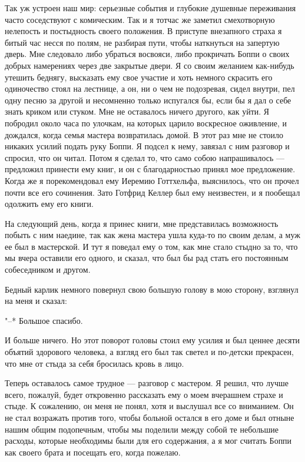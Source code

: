 Так  уж  устроен  наш  мир:  серьезные  события  и  глубокие  душевные
переживания часто соседствуют с комическим.  Так и я тотчас же заметил
смехотворную  нелепость и  постыдность  своего  положения. В  приступе
внезапного страха я битый час несся  по полям, не разбирая пути, чтобы
наткнуться на  запертую дверь.  Мне следовало либо  убраться восвояси,
либо прокричать  Боппи о  своих добрых  намерениях через  две закрытые
двери. Я со  своим желанием как-нибудь утешить  беднягу, высказать ему
свое  участие  и  хоть  немного  скрасить  его  одиночество  стоял  на
лестнице, а он,  ни о чем не подозревая, сидел  внутри, пел одну песню
за другой и несомненно только испугался бы, если бы я дал о себе знать
криком  или  стуком.  Мне  не оставалось  ничего  другого,  как  уйти.
Я  побродил  около  часа  по улочкам,  на  которых  царило  воскресное
оживление, и дождался, когда семья  мастера возвратилась домой. В этот
раз мне не  стоило никаких усилий подать руку Боппи.  Я подсел к нему,
завязал с ним разговор и спросил, что он читал. Потом я сделал то, что
само  собою напрашивалось  --- предложил  принести  ему книг,  и он  с
благодарностью принял  мое предложение. Когда же  я порекомендовал ему
Иеремию Готтхельфа, выяснилось, что он прочел почти все его сочинения.
Зато Готфрид Келлер был ему неизвестен,  и я пообещал одолжить ему его
книги.

На следующий день, когда я принес книги, мне представилась возможность
побыть  с ним  наедине, так  как жена  мастера ушла  куда-то по  своим
делам, а муж ее  был в мастерской. И тут я поведал ему  о том, как мне
стало стыдно  за то, что мы  вчера оставили его одного,  и сказал, что
был бы рад стать его постоянным собеседником и другом.

Бедный  карлик немного  повернул свою  большую голову  в мою  сторону,
взглянул на меня и сказал:

"--* Большое спасибо.

И больше ничего. Но этот поворот  головы стоил ему усилия и был ценнее
десяти  объятий здорового  человека, а  взгляд  его был  так светел  и
по-детски прекрасен, что мне от стыда за себя бросилась кровь в лицо.

Теперь оставалось самое трудное ---  разговор с мастером. Я решил, что
лучше всего, пожалуй, будет откровенно рассказать ему о моем вчерашнем
страхе и стыде. К сожалению, он меня  не понял, хотя и выслушал все со
вниманием. Он не  стал возражать против того, чтобы  больной остался в
его  доме и  был  отныне  нашим общим  подопечным,  чтобы мы  поделили
между  собой те  небольшие расходы,  которые необходимы  были для  его
содержания, а  я мог считать  Боппи как  своего брата и  посещать его,
когда пожелаю.

